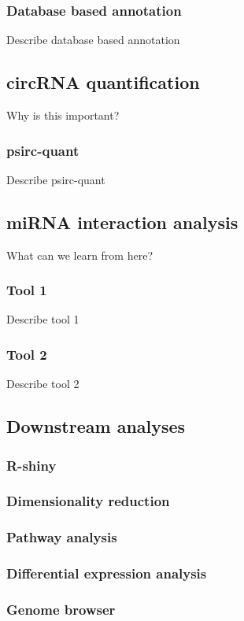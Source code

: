 \subsubsection{Database based annotation}
Describe database based annotation

\subsection{circRNA quantification}

Why is this important?

\subsubsection{psirc-quant}
Describe psirc-quant

\subsection{miRNA interaction analysis}
What can we learn from here?

\subsubsection{Tool 1}
Describe tool 1

\subsubsection{Tool 2}
Describe tool 2

\subsection{Downstream analyses}
\subsubsection{R-shiny}
\subsubsection{Dimensionality reduction}
\subsubsection{Pathway analysis}
\subsubsection{Differential expression analysis}
\subsubsection{Genome browser}
